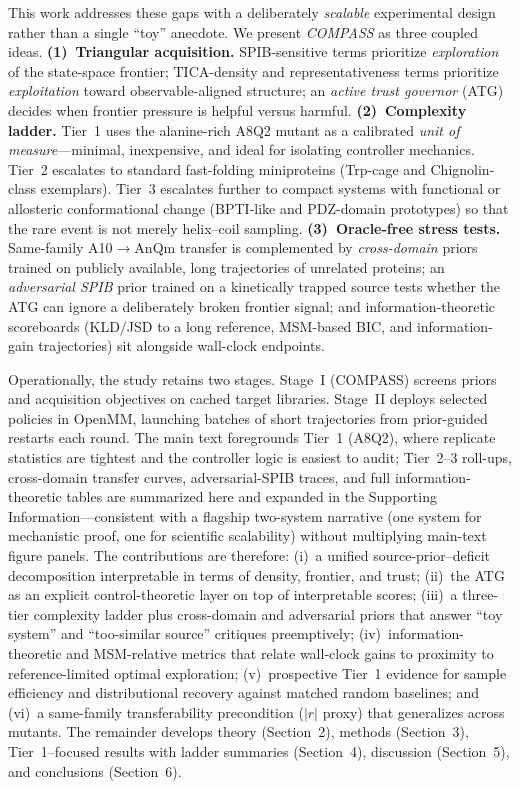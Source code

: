 \documentclass[journal=jctcce,manuscript=article,layout=twocolumn]{achemso}
\begin{document}
This work addresses these gaps with a deliberately \emph{scalable} experimental design rather than a single ``toy'' anecdote. We present \emph{COMPASS} as three coupled ideas. \textbf{(1)~Triangular acquisition.} SPIB-sensitive terms prioritize \emph{exploration} of the state-space frontier; TICA-density and representativeness terms prioritize \emph{exploitation} toward observable-aligned structure; an \emph{active trust governor} (ATG) decides when frontier pressure is helpful versus harmful. \textbf{(2)~Complexity ladder.} Tier~1 uses the alanine-rich A8Q2 mutant as a calibrated \emph{unit of measure}---minimal, inexpensive, and ideal for isolating controller mechanics. Tier~2 escalates to standard fast-folding miniproteins (Trp-cage and Chignolin-class exemplars). Tier~3 escalates further to compact systems with functional or allosteric conformational change (BPTI-like and PDZ-domain prototypes) so that the rare event is not merely helix--coil sampling. \textbf{(3)~Oracle-free stress tests.} Same-family A10$\to$AnQm transfer is complemented by \emph{cross-domain} priors trained on publicly available, long trajectories of unrelated proteins; an \emph{adversarial SPIB} prior trained on a kinetically trapped source tests whether the ATG can ignore a deliberately broken frontier signal; and information-theoretic scoreboards (KLD/JSD to a long reference, MSM-based BIC, and information-gain trajectories) sit alongside wall-clock endpoints.

Operationally, the study retains two stages. Stage~I (COMPASS) screens priors and acquisition objectives on cached target libraries. Stage~II deploys selected policies in OpenMM,\cite{eastman2017openmm} launching batches of short trajectories from prior-guided restarts each round. The main text foregrounds Tier~1 (A8Q2), where replicate statistics are tightest and the controller logic is easiest to audit; Tier~2--3 roll-ups, cross-domain transfer curves, adversarial-SPIB traces, and full information-theoretic tables are summarized here and expanded in the Supporting Information---consistent with a flagship two-system narrative (one system for mechanistic proof, one for scientific scalability) without multiplying main-text figure panels. The contributions are therefore: (i)~a unified source-prior--deficit decomposition interpretable in terms of density, frontier, and trust; (ii)~the ATG as an explicit control-theoretic layer on top of interpretable scores; (iii)~a three-tier complexity ladder plus cross-domain and adversarial priors that answer ``toy system'' and ``too-similar source'' critiques preemptively; (iv)~information-theoretic and MSM-relative metrics that relate wall-clock gains to proximity to reference-limited optimal exploration; (v)~prospective Tier~1 evidence for sample efficiency and distributional recovery against matched random baselines; and (vi)~a same-family transferability precondition ($|r|$ proxy) that generalizes across mutants. The remainder develops theory (Section~2), methods (Section~3), Tier~1--focused results with ladder summaries (Section~4), discussion (Section~5), and conclusions (Section~6).
\end{document}
